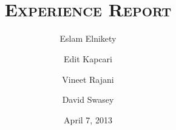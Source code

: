 \documentclass[a4paper]{article}
\title{\TITLE \\
	{\small\textsc{Experience Report}}%
}
\author{Eslam Elnikety \and Edit Kapcari \and Vineet Rajani \and David Swasey}
\date{April 7, 2013}
\begin{document}
\maketitle





\nocite{*}	%

\appendix


\end{document}

